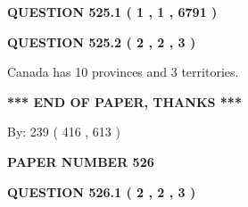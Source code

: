 \documentclass[12pt]{article}
\begin{document}
   
 \vspace{0.2in}
 
 
 
 
   
   
  
\vspace{0.2in}
  
{\textbf{\Large{QUESTION
525.1 
 ( 1 , 1 , 6791 )
}}}
  
  
  
\vspace{0.2in}
  
{\textbf{\Large{QUESTION
525.2 
 ( 2 , 2 , 3 )
}}}
  
  
 
 
\noindent{}
 
 
Canada has 10  provinces and 3 territories.
 
 
 
 
   
   
 \vspace{0.2in}
 
   
   
   
   
\vspace{1.0in} 
{\textbf{\large{ *** END OF PAPER, THANKS *** }}} 
   
   
\hspace{1.0in} By: 
 239 ( 416 ,  613 )
   
   
   
   
\newpage 
\setcounter{page}{ 
   526001 } 
   
   
   
   
 {\textbf{ \Large{ PAPER NUMBER  526  }}}
   
   
\vspace{0.2in}
   
   
   
   
   
   
 \vspace{0.2in}
 
 
 
 
   
   
  
\vspace{0.2in}
  
{\textbf{\Large{QUESTION
526.1 
 ( 2 , 2 , 3 )
}}}
  
  
 
\end{document}
